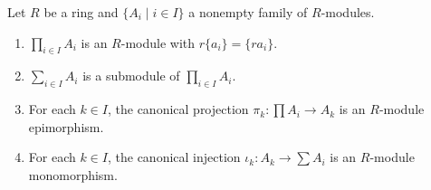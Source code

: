 Let $R$ be a ring and $\{A_i \mid i \in I\}$ a nonempty family of $R$-modules.
\begin{enumerate}
\item[(i)] $\prod_{i \in I} A_i$ is an $R$-module with $r\{a_i\} = \{ra_i\}$.
\item[(ii)] $\sum_{i \in I} A_i$ is a submodule of $\prod_{i \in I} A_i$.
\item[(iii)] For each $k \in I$, the canonical projection $\pi_k: \prod A_i \to A_k$ is an $R$-module epimorphism.
\item[(iv)] For each $k \in I$, the canonical injection $\iota_k: A_k \to \sum A_i$ is an $R$-module monomorphism.
\end{enumerate}
